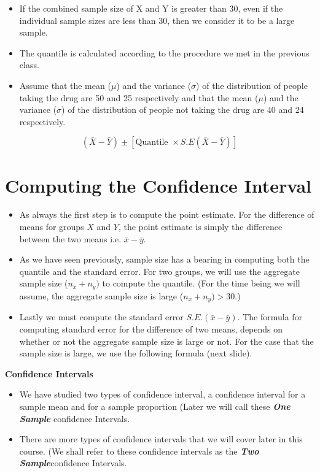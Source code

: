 \documentclass[]{report}
\begin{document}
\begin{itemize}
\item If the combined sample size of X and Y is greater than 30, even if the individual sample sizes are less than 30, then we consider it to be a large sample.
\item The quantile is calculated according to the procedure we met in the previous class.

\item Assume that the mean ($\mu$) and the variance ($\sigma$) of the distribution
of people taking the drug are 50 and 25 respectively and that the mean ($\mu$)
and the variance ($\sigma$) of the distribution of people not taking the drug are
40 and 24 respectively.
\end{itemize}
\[ ( \bar{X} - \bar{Y} ) \pm \left[ \mbox{Quantile } \times S.E(\bar{X}-\bar{Y}) \right] \]



\section{Computing the Confidence Interval}

\begin{itemize}
\item As always the first step is to compute the point estimate. For the difference of means for groups $X$ and $Y$, the point estimate is simply the difference between the two means i.e. $\bar{x} - \bar{y}$.

\item As we have seen previously, sample size has a bearing in computing both the quantile and the standard error.
For two groups, we will use the aggregate sample size ($n_x+n_y)$ to compute the quantile. (For the time being we will assume, the aggregate sample size is large ($n_x+n_y)> 30$.)

\item Lastly we must compute the standard error $S.E.(\bar{x}-\bar{y})$. The formula for computing standard error for the difference of two means, depends on whether or not the aggregate sample size is large or not. For the case that the sample size is large, we use the following formula (next slide).
\end{itemize}





\textbf{Confidence Intervals}
\begin{itemize}
\item We have studied two types of confidence interval, a confidence interval for a sample mean and for a sample proportion (Later we will call these \textbf{\textit{One Sample}} confidence Intervals.
\item There are more types of confidence intervals that we will cover later in this course. (We shall refer to these confidence intervals as the \textbf{\textit{Two Sample}}confidence Intervals.
\end{itemize}
\end{document}
